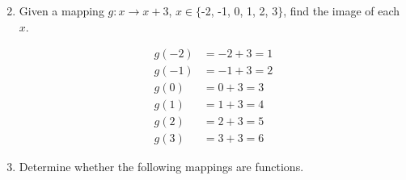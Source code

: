 \documentclass[12pt]{report}
\begin{document}
\begin{enumerate}[leftmargin=15pt]

  \setcounter{enumi}{1}

  \item Given a mapping $g:x \to x+3$, $x \in\big\{$-2, -1, 0, 1, 2, 3$\big\}$, find
        the image of each $x$.

        \sol{}
        \begin{align*}
          g(-2) & = -2 + 3 = 1 \\
          g(-1) & = -1 + 3 = 2 \\
          g(0)  & = 0 + 3 = 3  \\
          g(1)  & = 1 + 3 = 4  \\
          g(2)  & = 2 + 3 = 5  \\
          g(3)  & = 3 + 3 = 6
        \end{align*}
        \newpage

  \item Determine whether the following mappings are functions.
\end{enumerate}
\setlength{\columnseprule}{1pt}
\setlength{\columnsep}{24pt}
\end{document}
